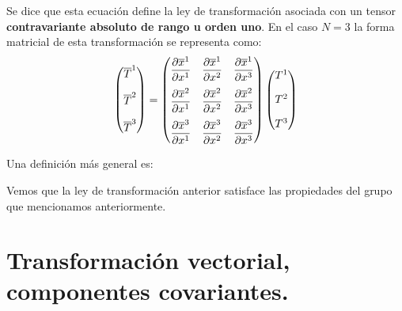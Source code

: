 \documentclass[hidelinks,12pt]{article}
\begin{document}
Se dice que esta ecuación define la ley de transformación asociada con un tensor \textbf{contravariante absoluto de rango u orden uno}. En el caso $N = 3$ la forma matricial de esta transformación se representa como:
\begin{align}
\mqty(
\overline{T}^{1} \\[1em]
\overline{T}^{2} \\[1em]
\overline{T}^{3}
) = \mqty(
\displaystyle \pdv{\overline{x}^{1}}{x^{1}} & \displaystyle \pdv{\overline{x}^{1}}{x^{2}} & \displaystyle \pdv{\overline{x}^{1}}{x^{3}} \\[1em]
\displaystyle \pdv{\overline{x}^{2}}{x^{1}} & \displaystyle \pdv{\overline{x}^{2}}{x^{2}} & \displaystyle \pdv{\overline{x}^{2}}{x^{3}} \\[1em]
\displaystyle \pdv{\overline{x}^{3}}{x^{1}} & \displaystyle \pdv{\overline{x}^{3}}{x^{2}} & \displaystyle \pdv{\overline{x}^{3}}{x^{3}}
) \, \mqty(
T^{1} \\[1em]
T^{2} \\[1em]
T^{3}
)
\label{eq:ecuacion_01_02_41}
\end{align}

Una definición más general es:
\begin{center}
    \noindent{}
\end{center}
\par
Vemos que la ley de transformación anterior satisface las propiedades del grupo que mencionamos anteriormente.

\section{Transformación vectorial, componentes covariantes.}
\end{document}
